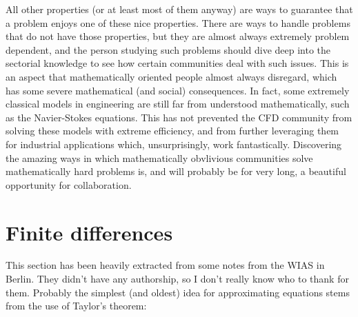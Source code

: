 \documentclass{article}
\begin{document}
All other properties (or at least most of them anyway) are ways to guarantee that a problem enjoys one of these nice properties. There are ways to handle problems that do not have those properties, but they are almost always extremely problem dependent, and the person studying such problems should dive deep into the sectorial knowledge to see how certain communities deal with such issues. This is an aspect that mathematically oriented people almost always disregard, which has some severe mathematical (and social) consequences. In fact, some extremely classical models in engineering are still far from understood mathematically, such as the Navier-Stokes equations. This has not prevented the CFD community from solving these models with extreme efficiency, and from further leveraging them for industrial applications which, unsurprisingly, work fantastically. Discovering the amazing ways in which mathematically obvlivious communities solve mathematically hard problems is, and will probably be for very long, a beautiful opportunity for collaboration.

\section{Finite differences}
This section has been heavily extracted from some notes from the WIAS in Berlin. They didn't have any authorship, so I don't really know who to thank for them.  Probably the simplest (and oldest) idea for approximating equations stems from the use of Taylor's theorem:
\end{document}
